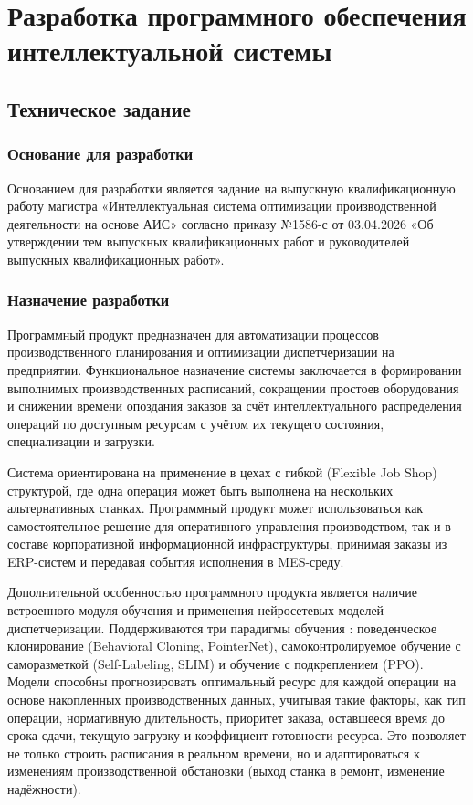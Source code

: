 \section{Разработка программного обеспечения интеллектуальной системы}
\subsection{Техническое задание}                   %
\subsubsection{Основание для разработки}  

Основанием для разработки является задание на выпускную квалификационную работу магистра «Интеллектуальная система оптимизации производственной деятельности на основе АИС» согласно приказу №1586-с от 03.04.2026 «Об утверждении тем выпускных квалификационных работ и руководителей выпускных квалификационных работ».

\subsubsection{Назначение разработки}

Программный продукт предназначен для автоматизации процессов производственного планирования и оптимизации диспетчеризации на предприятии. Функциональное назначение системы заключается в формировании выполнимых производственных расписаний, сокращении простоев оборудования и снижении времени опоздания заказов за счёт интеллектуального распределения операций по доступным ресурсам с учётом их текущего состояния, специализации и загрузки.

Система ориентирована на применение в цехах с гибкой (Flexible Job Shop) структурой, где одна операция может быть выполнена на нескольких альтернативных станках. Программный продукт может использоваться как самостоятельное решение для оперативного управления производством, так и в составе корпоративной информационной инфраструктуры, принимая заказы из ERP-систем и передавая события исполнения в MES-среду.

Дополнительной особенностью программного продукта является наличие встроенного модуля обучения и применения нейросетевых моделей диспетчеризации. Поддерживаются три парадигмы обучения \cite{prinreshen}: поведенческое клонирование (Behavioral Cloning, PointerNet), самоконтролируемое обучение с саморазметкой (Self‑Labeling, SLIM) и обучение с подкреплением (PPO). Модели способны прогнозировать оптимальный ресурс для каждой операции на основе накопленных производственных данных, учитывая такие факторы, как тип операции, нормативную длительность, приоритет заказа, оставшееся время до срока сдачи, текущую загрузку и коэффициент готовности ресурса. Это позволяет не только строить расписания в реальном времени, но и адаптироваться к изменениям производственной обстановки (выход станка в ремонт, изменение надёжности).

